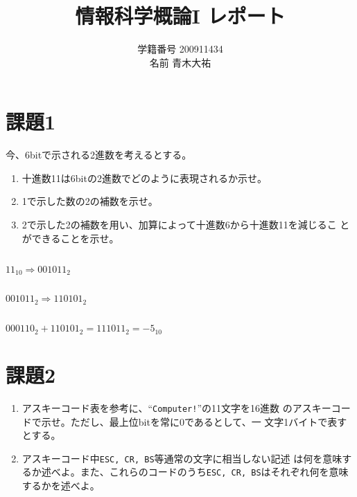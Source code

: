 \documentclass[a4j,9pt]{jsarticle}
\title{情報科学概論I レポート}
\author{学籍番号 200911434 \\ 名前 青木大祐}
\begin{document}
\maketitle

\section{課題1}
\begin{screen}
 今、6bitで示される2進数を考えるとする。
\begin{enumerate}
 \item 十進数11は6bitの2進数でどのように表現されるか示せ。
 \item 1で示した数の2の補数を示せ。
 \item 2で示した2の補数を用い、加算によって十進数6から十進数11を減じるこ
       とができることを示せ。
\end{enumerate}
\end{screen}

\subsection{}
$11_{10} \Rightarrow 001011_{2}$

\subsection{}
$001011_{2} \Rightarrow 110101_{2}$

\subsection{}
$000110_{2} + 110101_{2} = 111011_{2} = -5_{10}$

\section{課題2}
\begin{screen}
 \begin{enumerate}
  \item アスキーコード表を参考に、``\texttt{Computer!}''の11文字を16進数
        のアスキーコードで示せ。ただし、最上位bitを常に0であるとして、一
        文字1バイトで表すとする。
  \item アスキーコード中\texttt{ESC, CR, BS}等通常の文字に相当しない記述
        は何を意味するか述べよ。また、これらのコードのうち\texttt{ESC,
        CR, BS}はそれぞれ何を意味するかを述べよ。
 \end{enumerate}
\end{screen}
\end{document}
